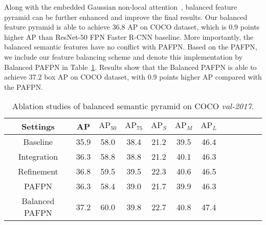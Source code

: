 \documentclass[10pt,twocolumn,letterpaper]{article}
\begin{document}
Along with the embedded Gaussian non-local attention~\cite{nonlocal}, balanced feature pyramid can be further enhanced and improve the final results.
Our balanced feature pyramid is able to achieve 36.8 AP on COCO dataset, which is 0.9 points higher AP than ResNet-50 FPN Faster R-CNN baseline.
More importantly, the balanced semantic features have no conflict with PAFPN.
Based on the PAFPN, we include our feature balancing scheme and denote this implementation by Balanced PAFPN in Table~\ref{tab:fpn}.
Results show that the Balanced PAFPN is able to achieve 37.2 box AP on COCO dataset, with 0.9 points higher AP compared with the PAFPN.

\begin{table}[t]
	\centering
	\caption{Ablation studies of balanced semantic pyramid on COCO \emph{val-2017}.}
	\vspace{-5pt}
	\addtolength{\tabcolsep}{-2pt}
	\begin{tabular}{*{12}{c}}
		\toprule
		Settings          & AP   & $\text{AP}_{50}$ & $\text{AP}_{75}$ & $\text{AP}_{S}$ & $\text{AP}_{M}$ & $\text{AP}_{L}$ \\
		\midrule
		Baseline          & 35.9 & 58.0             & 38.4             & 21.2            & 39.5            & 46.4            \\
		\midrule
		Integration       & 36.3 & 58.8             & 38.8             & 21.2            & 40.1            & 46.3            \\
		Refinement        & 36.8 & 59.5             & 39.5             & 22.3            & 40.6            & 46.5            \\
		\midrule
		PAFPN\cite{panet} & 36.3 & 58.4             & 39.0             & 21.7            & 39.9            & 46.3            \\
		Balanced PAFPN    & 37.2 & 60.0             & 39.8             & 22.7            & 40.8            & 47.4            \\
		\bottomrule
	\end{tabular}
	\vspace{-10pt}
	\label{tab:fpn}
\end{table}
\end{document}
